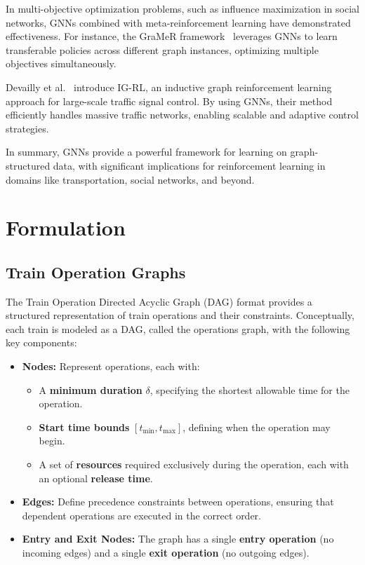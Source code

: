 \documentclass[runningheads]{llncs}
\begin{document}
In multi-objective optimization problems, such as influence maximization in social networks, GNNs combined with meta-reinforcement learning have demonstrated effectiveness. For instance, the GraMeR framework~\cite{gnndrl:munikoti2022gramergraphmetareinforcement} leverages GNNs to learn transferable policies across different graph instances, optimizing multiple objectives simultaneously.

Devailly et al.~\cite{gnndrl:Devailly_2022} introduce IG-RL, an inductive graph reinforcement learning approach for large-scale traffic signal control. By using GNNs, their method efficiently handles massive traffic networks, enabling scalable and adaptive control strategies.

In summary, GNNs provide a powerful framework for learning on graph-structured data, with significant implications for reinforcement learning in domains like transportation, social networks, and beyond.

\section{Formulation}
\label{sse:formulation}

\subsection{Train Operation Graphs}
\label{sss:train_ops}

The Train Operation Directed Acyclic Graph (DAG) format provides a structured representation of train operations and their constraints. Conceptually, each train is modeled as a DAG, called the operations graph, with the following key components:

\begin{itemize}
    \item \textbf{Nodes:} Represent operations, each with:
    \begin{itemize}
        \item A \textbf{minimum duration} $\delta$, specifying the shortest allowable time for the operation.
        \item \textbf{Start time bounds} $[t_{\text{min}}, t_{\text{max}}]$, defining when the operation may begin.
        \item A set of \textbf{resources} required exclusively during the operation, each with an optional \textbf{release time}.
    \end{itemize}
    \item \textbf{Edges:} Define precedence constraints between operations, ensuring that dependent operations are executed in the correct order.
    \item \textbf{Entry and Exit Nodes:} The graph has a single \textbf{entry operation} (no incoming edges) and a single \textbf{exit operation} (no outgoing edges).
\end{itemize}
\end{document}
